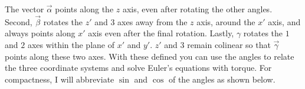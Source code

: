 \documentclass[10pt]{article}
\begin{document}
\begin{figure}[H]
\begin{center}
\begin{minipage}{0.49\textwidth}
\end{minipage}
\end{center}
\end{figure}

The vector $\vec{\alpha}$ points along the 
$z$ axis, even after rotating the other angles. Second, $\vec{\beta}$ rotates 
the $z'$ and $3$ axes away from the $z$ axis, around the $x'$ axis, and 
always points along $x'$ axis even after the final rotation. Lastly, 
$\gamma$ rotates the $1$ and $2$ axes within the plane of $x'$ and $y'$. 
$z'$ and $3$ remain colinear so that $\vec{\gamma}$ points along these 
two axes. With these defined you can use the angles to relate the three 
coordinate systems and solve Euler's equations with torque. For compactness, 
I will abbreviate $\sin$ and $\cos$ of the angles as shown below.
\end{document}

